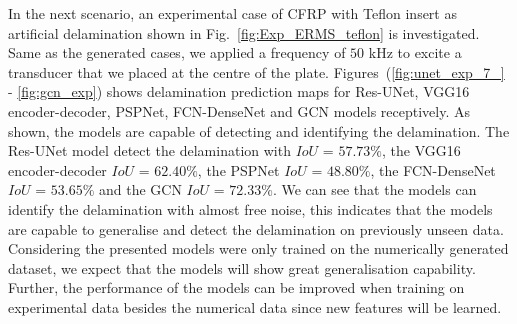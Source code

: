 In the next scenario, an experimental case of CFRP with Teflon insert as artificial delamination shown in Fig.~\ref{fig:Exp_ERMS_teflon} is investigated.  
Same as the generated cases, we applied a frequency of \(50\) kHz to excite a transducer that we placed at the centre of the plate.
Figures~(\ref{fig:unet_exp_7_} - \ref{fig:gcn_exp}) shows delamination prediction maps for Res-UNet, VGG16 encoder-decoder, PSPNet, FCN-DenseNet and GCN models receptively.
As shown, the models are capable of detecting and identifying the delamination. 
The Res-UNet model detect the delamination with \(IoU\) = \(57.73\%\), the VGG16 encoder-decoder \(IoU\)  = \(62.40\%\), the PSPNet \(IoU\) = \(48.80\%\), the FCN-DenseNet \(IoU\) = \(53.65\%\) and the GCN \(IoU\) = \(72.33\%\).
We can see that the models can identify the delamination with almost free noise, this indicates that the models are capable to generalise and detect the delamination on previously unseen data. 
Considering the presented models were only trained on the numerically generated dataset, we expect that the models will show great generalisation capability.
Further, the performance of the models can be improved when training on experimental data besides the numerical data since new features will be learned. 
